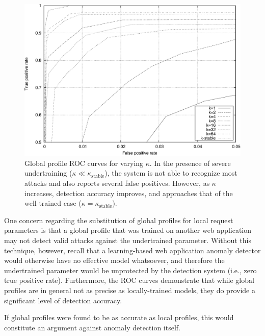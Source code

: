 \begin{figure}[t]
  \centering
  \includegraphics[width=.9\textwidth]{figures/web/longtail/fig_roc}
  \caption{Global profile ROC curves for varying $\kappa$. In the presence
    of severe undertraining ($\kappa \ll \kappa_{\text{stable}}$), the
    system is not able to recognize most attacks and also reports
    several false positives. However, as $\kappa$ increases, detection
    accuracy improves, and approaches that of the well-trained case
    ($\kappa=\kappa_{\text{stable}}$).}
  \label{fig:roc}
  \vspace*{-.5cm}
\end{figure}

One concern regarding the substitution of global profiles for local
request parameters is that a global profile that was trained on
another web application may not detect valid attacks against the
undertrained parameter.  Without this technique, however, recall that
a learning-based web application anomaly detector would otherwise have
no effective model whatsoever, and therefore the undertrained
parameter would be unprotected by the detection system (i.e., zero
true positive rate).  Furthermore, the \ac{ROC} curves
demonstrate that while global profiles are in general not as precise
as locally-trained models, they do provide a significant level of
detection accuracy.

\begin{note}
  If global profiles were found to be as accurate as local profiles,
  this would constitute an argument against anomaly detection itself.
\end{note}

